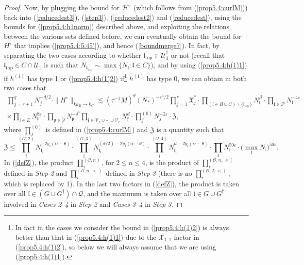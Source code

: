 \documentclass[11 pt,reqno]{amsart}
\theoremstyle{definition}
\theoremstyle{remark}
\numberwithin{equation}{section}
\newcommand{\Pc}{\mathcal{P}}
\newcommand{\Qc}{\mathcal{Q}}
\newcommand{\Uc}{\mathcal{U}}
\newcommand{\Vc}{\mathcal{V}}
\newcommand{\Xc}{\mathcal{X}}
\newcommand{\Yc}{\mathcal{Y}}
\newcommand{\pf}{\mathfrak{p}}
\newcommand{\Hc}{\mathcal{H}}
\newcommand{\ff}{\mathfrak{f}}
\newcommand{\Xf}{\mathfrak{X}}
\newcommand{\Zf}{\mathfrak{Z}}
\newcommand{\lf}{\mathfrak{l}}
\newcommand{\Os}{\mathscr{O}}
\begin{document}
{\begin{proof}
Now, by plugging the bound for $\Hc^\dagger$ (which follows from (\ref{prop5.4:curlM})) back into (\ref{reducedest3}), (\ref{step3}), (\ref{reducedest2}) and (\ref{reducedest}), using the bounds for (\ref{prop5.4:h1norm}) described above, and exploiting the relations between the various sets defined before, we can eventually obtain the bound for $H^\circ$ that implies (\ref{prop5.4:5.45'}), and hence (\ref{boundmerge7}). In fact, by separating the two cases according to whether $\lf_{\mathrm{top}}\in \Uc_1^\dagger$ or not (recall that $\lf_{\mathrm{top}}\in C\cap \Uc_1$ is such that $N_{\lf_{\mathrm{top}}}\sim\max\{N_\lf:\lf\in C\}$), and by using (\ref{prop5.4:h(1)1}) if $h^{(1)}$ has type 1 or (\ref{prop5.4:h(1)2}) if\footnote{In fact in the cases we consider the bound in (\ref{prop5.4:h(1)2}) is always better than that in (\ref{prop5.4:h(1)1}) due to the $\Xc_{1,1}$ factor in (\ref{prop5.4:h(1)2}), so below we will always assume that we are using (\ref{prop5.4:h(1)1}).} $h^{(1)}$ has type 0, we can obtain in both two cases that
\begin{multline}\label{boundmergefinal}\prod_{j=r+1}^q N_j^{-d/2}\cdot\|H^\circ\|_{kk_{B}\to k_{C}}\lesssim(\tau^{-1}M)^\theta
 (N_*)^{-\varepsilon^3/2}
\prod_{j=1}^r\Xf_j^*\cdot
\prod_{(\lf\in B\cup C)\backslash\{\lf_{\mathrm{top}}\}}N_\lf^\beta
\cdot\prod_{\lf\in\Pc}N_\lf^{-4\varepsilon}\\\times\prod_{\lf\in E}N_\lf^{8\varepsilon}\cdot\prod_{\pf\in\widetilde{\Yc}}N_\pf^{-\delta^3}\prod_{\ff \in \Vc_1\cup\cdots\cup\Vc_r} N_\ff^d\cdot\prod_{j}^{(0)}N_j^{-2\varepsilon}\cdot\Zf,
 \end{multline} where $\prod_{j}^{(0)}$ is defined in (\ref{prop5.4:curlM}) and $\Zf$ is a quantity such that
 \begin{equation}\label{defZ}\Zf\leq\prod_i^{(\Os,2)}N_{\lf_i}^{-2y_i(\alpha-\theta)}\cdot\prod_i^{(\Os,3)}N_{\lf_i}^{(d/2)-2y_i(\alpha-\theta)}\cdot\prod_i^{(\Os,4)}N_{\lf_i}^{d-2y_i(\alpha-\theta)}\cdot\prod_{\lf}N_\lf^{50\varepsilon}\cdot\big(\max_\lf N_\lf\big)^{50\varepsilon}.\end{equation} In (\ref{defZ}), the product $\prod_i^{(\Os,n)}$, for $2\leq n\leq 4$, is the product of $\prod_i^{(\Os,n,\geq)}$ defined in \emph{Step 2} and $\prod_i^{(\Os,n,<)}$ defined in \emph{Step 3} (there is no $\prod_i^{(\Os,2,<)}$, which is replaced by 1). In the last two factors in (\ref{defZ}), the product is taken over all $\lf\in (G\cup G^\dagger)\cap\Qc$, and the maximum is taken over all $\lf\in G\cup G^\dagger$ involved in \emph{Cases 2--4} in \emph{Step 2} and \emph{Cases 3--4} in \emph{Step 3}.
 

\end{proof}}
\end{document}
